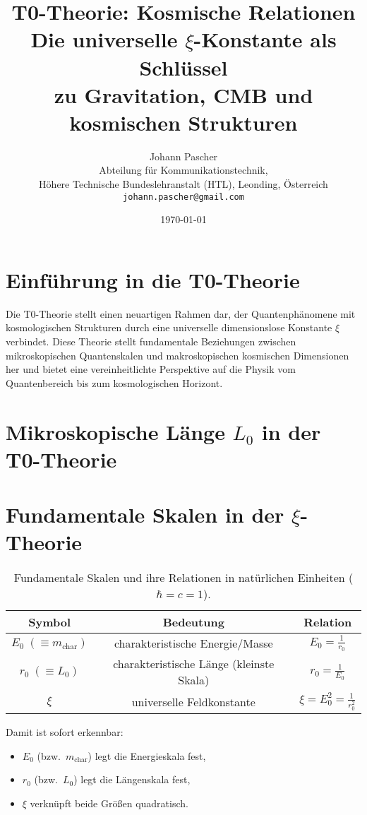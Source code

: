 \documentclass[12pt,a4paper]{article}
\title{\Huge\textbf{T0-Theorie: Kosmische Relationen}\\
	\Large Die universelle $\xi$-Konstante als Schlüssel \\ zu Gravitation, CMB und kosmischen Strukturen}
\author{\Large Johann Pascher\\
	Abteilung für Kommunikationstechnik,\\
	Höhere Technische Bundeslehranstalt (HTL), Leonding, Österreich\\
	\texttt{johann.pascher@gmail.com}}
\date{\today}
\numberwithin{equation}{section}
\begin{document}
	
	\maketitle
	\thispagestyle{fancy}
	
	\tableofcontents
	
	\section{Einführung in die T0-Theorie}
	
	Die T0-Theorie stellt einen neuartigen Rahmen dar, der Quantenphänomene mit kosmologischen Strukturen durch eine universelle dimensionslose Konstante $\xi$ verbindet. Diese Theorie stellt fundamentale Beziehungen zwischen mikroskopischen Quantenskalen und makroskopischen kosmischen Dimensionen her und bietet eine vereinheitlichte Perspektive auf die Physik vom Quantenbereich bis zum kosmologischen Horizont.
	
	\section{Mikroskopische Länge $L_0$ in der T0-Theorie}
	\section{Fundamentale Skalen in der $\xi$-Theorie}
	
	\begin{table}[h!]
		\centering
		\renewcommand{\arraystretch}{1.5}
		\begin{tabular}{|c|c|c|}
			\hline
			\textbf{Symbol} & \textbf{Bedeutung} & \textbf{Relation} \\
			\hline
			$E_0 \;(\equiv m_{\mathrm{char}})$ & charakteristische Energie/Masse & $E_0 = \tfrac{1}{r_0}$ \\
			\hline
			$r_0 \;(\equiv L_0)$ & charakteristische Länge (kleinste Skala) & $r_0 = \tfrac{1}{E_0}$ \\
			\hline
			$\xi$ & universelle Feldkonstante & $\xi = E_0^2 = \tfrac{1}{r_0^2}$ \\
			\hline
		\end{tabular}
		\caption{Fundamentale Skalen und ihre Relationen in natürlichen Einheiten ($\hbar = c = 1$).}
	\end{table}
	
	Damit ist sofort erkennbar:
	\begin{itemize}
		\item $E_0$ (bzw.\ $m_{\mathrm{char}}$) legt die Energieskala fest,
		\item $r_0$ (bzw.\ $L_0$) legt die Längenskala fest,
		\item $\xi$ verknüpft beide Größen quadratisch.
	\end{itemize}
\end{document}
